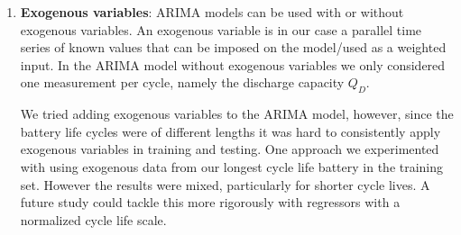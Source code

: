 \documentclass{article}
\begin{document}
\begin{enumerate}[label=(\alph*), leftmargin=.35in]

\item \textbf{Exogenous variables}: ARIMA models can be used with or without exogenous variables. An exogenous variable is in our case a parallel time series of known values that can be imposed on the model/used as a weighted input. In the ARIMA model without exogenous variables we only considered one measurement per cycle, namely the discharge capacity $Q_D$.  

We tried adding exogenous variables to the ARIMA model, however, since the battery life cycles were of different lengths it was hard to consistently apply exogenous variables in training and testing. One approach we experimented with using exogenous data from our longest cycle life battery in the training set. However the results were mixed, particularly for shorter cycle lives. A future study could tackle this more rigorously with regressors with a normalized cycle life scale. 

\end{enumerate}
\end{document}
